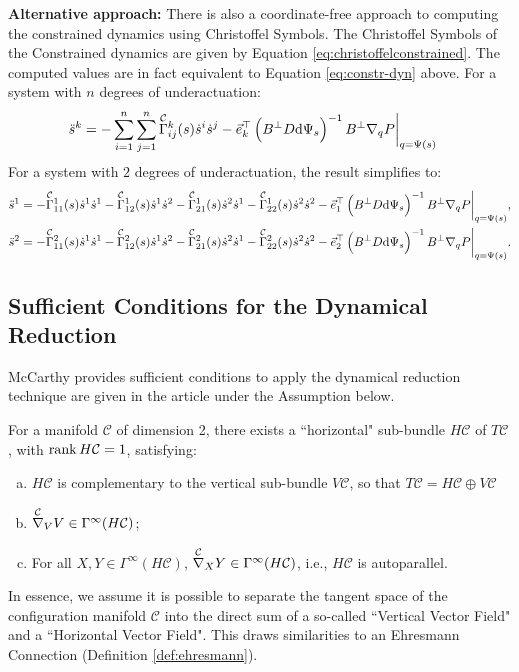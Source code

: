 \documentclass[main.tex]{subfiles}
\begin{document}
\textbf{Alternative approach:} There is also a coordinate-free approach to computing the constrained dynamics using Christoffel Symbols. The Christoffel Symbols of the Constrained dynamics are given by Equation \ref{eq:christoffelconstrained}. 
The computed values are in fact equivalent to Equation \ref{eq:constr-dyn} above\cite{nielsen-note}. 
For a system with $n$ degrees of underactuation:
\begin{align}
\ddot s^k &= -\sum_{i=1}^{n}\sum_{j=1}^{n}\Gammac{k}{ij}(s)\dot{s}^i\dot{s}^j-\Vec{e}_k^\top\del{B^\bot D \dd\Psi_s}\inv B^\bot\nabla_q P \bigg|_{q=\Psi(s)}
\end{align}
For a system with $2$ degrees of underactuation, the result simplifies to:
\begin{align}
\begin{aligned}
\ddot s^1 &= 
-\Gammac{1}{11}(s)\dot{s}^1\dot{s}^1
-\Gammac{1}{12}(s)\dot{s}^1\dot{s}^2
-\Gammac{1}{21}(s)\dot{s}^2\dot{s}^1
-\Gammac{1}{22}(s)\dot{s}^2\dot{s}^2
-\Vec{e}_1^\top\del{B^\bot D \dd\Psi_s}\inv B^\bot\nabla_q P \bigg|_{q=\Psi(s)},\\
\ddot s^2 &= 
-\Gammac{2}{11}(s)\dot{s}^1\dot{s}^1
-\Gammac{2}{12}(s)\dot{s}^1\dot{s}^2
-\Gammac{2}{21}(s)\dot{s}^2\dot{s}^1
-\Gammac{2}{22}(s)\dot{s}^2\dot{s}^2
-\Vec{e}_2^\top\del{B^\bot D \dd\Psi_s}\inv B^\bot\nabla_q P \bigg|_{q=\Psi(s)}.
\end{aligned}\label{eq:constr-dyn-gammac}
\end{align}

\subsection{Sufficient Conditions for the Dynamical Reduction}
McCarthy provides sufficient conditions to apply the dynamical reduction technique are given in the article under the Assumption below.
\begin{boxassumption}{\cite{mccarthy}}
For a manifold $\mathcal{C}$ of dimension 2, there exists a ``horizontal" sub-bundle $H\mathcal{C}$ of $T\mathcal{C}$, with $\rank H\mathcal{C}=1$, satisfying:
\begin{enumerate}[(a)]
    \item $H\mathcal{C}$ is complementary to the vertical sub-bundle $V\mathcal{C}$, so that $T\mathcal{C}=H\mathcal{C}\oplus V\mathcal{C}$
\item $\nablac_V V \in\Gamma^\infty(H\mathcal{C})$;
\item For all $X,Y\in \Gamma^\infty(H\mathcal{C})$, $\nablac_X Y \in \Gamma^\infty(H\mathcal{C})$, i.e., $H\mathcal{C}$ is autoparallel.
\end{enumerate}
\end{boxassumption}\label{assumption1}
In essence, we assume it is possible to separate the tangent space of the configuration manifold $\mathcal{C}$ into the direct sum of a so-called ``Vertical Vector Field" and a ``Horizontal Vector Field". This draws similarities to an Ehresmann Connection (Definition \ref{def:ehresmann}).
\end{document}
